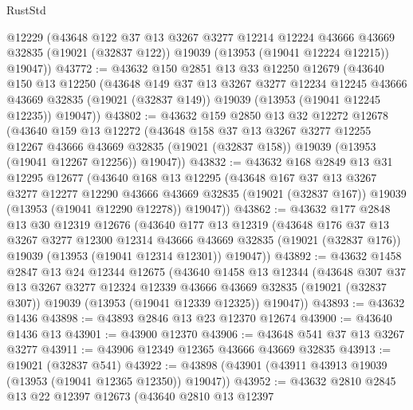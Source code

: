 \begin{lexlean}{RustStd}
\begin{coremodule}
      @12229
      (@43648
        @122
        @37
        @13
        @3267
        @3277
        @12214
        @12224
        @43666
        @43669
        @32835
        (@19021 (@32837 @122))
        @19039
        (@13953 (@19041 @12224 @12215))
        @19047))
@43772 := @43632
    @150
    @2851
    @13
    @33
    @12250
    @12679
    (@43640
      @150
      @13
      @12250
      (@43648
        @149
        @37
        @13
        @3267
        @3277
        @12234
        @12245
        @43666
        @43669
        @32835
        (@19021 (@32837 @149))
        @19039
        (@13953 (@19041 @12245 @12235))
        @19047))
@43802 := @43632
    @159
    @2850
    @13
    @32
    @12272
    @12678
    (@43640
      @159
      @13
      @12272
      (@43648
        @158
        @37
        @13
        @3267
        @3277
        @12255
        @12267
        @43666
        @43669
        @32835
        (@19021 (@32837 @158))
        @19039
        (@13953 (@19041 @12267 @12256))
        @19047))
@43832 := @43632
    @168
    @2849
    @13
    @31
    @12295
    @12677
    (@43640
      @168
      @13
      @12295
      (@43648
        @167
        @37
        @13
        @3267
        @3277
        @12277
        @12290
        @43666
        @43669
        @32835
        (@19021 (@32837 @167))
        @19039
        (@13953 (@19041 @12290 @12278))
        @19047))
@43862 := @43632
    @177
    @2848
    @13
    @30
    @12319
    @12676
    (@43640
      @177
      @13
      @12319
      (@43648
        @176
        @37
        @13
        @3267
        @3277
        @12300
        @12314
        @43666
        @43669
        @32835
        (@19021 (@32837 @176))
        @19039
        (@13953 (@19041 @12314 @12301))
        @19047))
@43892 := @43632
    @1458
    @2847
    @13
    @24
    @12344
    @12675
    (@43640
      @1458
      @13
      @12344
      (@43648
        @307
        @37
        @13
        @3267
        @3277
        @12324
        @12339
        @43666
        @43669
        @32835
        (@19021 (@32837 @307))
        @19039
        (@13953 (@19041 @12339 @12325))
        @19047))
@43893 := @43632 @1436
@43898 := @43893 @2846 @13 @23 @12370 @12674
@43900 := @43640 @1436 @13
@43901 := @43900 @12370
@43906 := @43648 @541 @37 @13 @3267 @3277
@43911 := @43906 @12349 @12365 @43666 @43669 @32835
@43913 := @19021 (@32837 @541)
@43922 := @43898 (@43901 (@43911 @43913 @19039 (@13953 (@19041 @12365 @12350)) @19047))
@43952 := @43632
    @2810
    @2845
    @13
    @22
    @12397
    @12673
    (@43640
      @2810
      @13
      @12397

\end{coremodule}
\end{lexlean}
